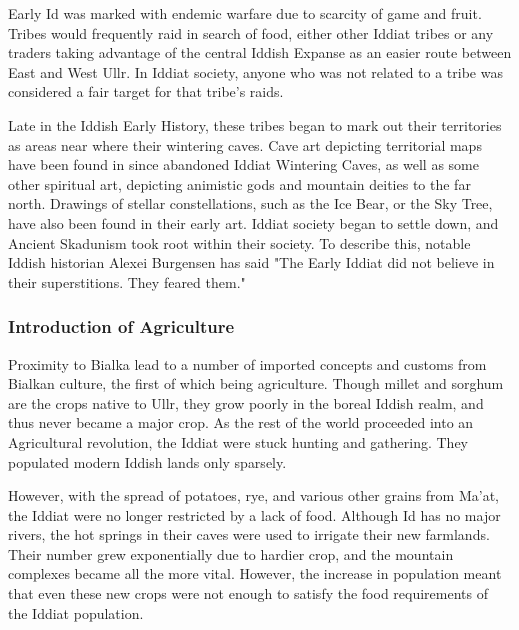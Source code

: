 			Early Id was marked with endemic warfare due to scarcity of game and fruit. Tribes would frequently raid in search of food, either other Iddiat tribes or any traders taking advantage of the central Iddish Expanse as an easier route between East and West Ullr. In Iddiat society, anyone who was not related to a tribe was considered a fair target for that tribe's raids.\par 
			
			Late in the Iddish Early History, these tribes began to mark out their territories as areas near where their wintering caves. Cave art depicting territorial maps have been found in since abandoned Iddiat Wintering Caves, as well as some other spiritual art, depicting animistic gods and mountain deities to the far north. Drawings of stellar constellations, such as the Ice Bear, or the Sky Tree, have also been found in their early art. Iddiat society began to settle down, and Ancient Skadunism took root within their society. To describe this, notable Iddish historian Alexei Burgensen has said "The Early Iddiat did not believe in their superstitions. They feared them."\par
			
			\subsubsection{Introduction of Agriculture}\par
			Proximity to Bialka lead to a number of imported concepts and customs from Bialkan culture, the first of which being agriculture. Though millet and sorghum are the crops native to Ullr, they grow poorly in the boreal Iddish realm, and thus never became a major crop. As the rest of the world proceeded into an Agricultural revolution, the Iddiat were stuck hunting and gathering. They populated modern Iddish lands only sparsely.\par 
			
			However, with the spread of potatoes, rye, and various other grains from Ma'at, the Iddiat were no longer restricted by a lack of food. Although Id has no major rivers, the hot springs in their caves were used to irrigate their new farmlands. Their number grew exponentially due to hardier crop, and the mountain complexes became all the more vital. However, the increase in population meant that even these new crops were not enough to satisfy the food requirements of the Iddiat population.\par 
			
